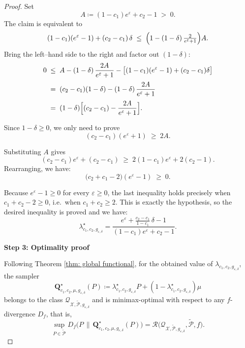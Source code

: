 \documentclass[accepted]{article}
\theoremstyle{plain} %
\theoremstyle{definition}
\theoremstyle{remark}
\newcommand{\eps}{\varepsilon}
\newcommand{\bQ}{\mathbf{Q}}
\begin{document}
\begin{proof}
Set
\[
A \coloneqq (1 - c_1)e^\varepsilon + c_2 - 1 \;>\; 0.
\]
The claim is equivalent to
\[
(1 - c_1)(e^\varepsilon - 1) + (c_2 - c_1)\,\delta
\;\le\;
\Bigl(1 - (1-\delta)\,\tfrac{2}{e^\varepsilon + 1}\Bigr)A .
\] 
Bring the left–hand side to the right and factor out $(1-\delta)$:  
\begin{align*}
0
&\;\le\;
A - (1-\delta)\,\frac{2A}{e^\varepsilon + 1}
      -\bigl[(1 - c_1)(e^\varepsilon - 1) + (c_2 - c_1)\delta\bigr]\\[2pt]
&\;=\;
(c_2 - c_1)(1-\delta) - (1-\delta)\,\frac{2A}{e^\varepsilon + 1}\\[2pt]
&\;=\;
(1-\delta)\Bigl[(c_2 - c_1) - \frac{2A}{e^\varepsilon + 1}\Bigr].
\end{align*}

Since $1-\delta \ge 0$, we only need to prove  
\[
(c_2 - c_1)(e^\varepsilon + 1) \;\ge\; 2A .
\]

Substituting $A$ gives
\[
(c_2 - c_1)e^\varepsilon + (c_2 - c_1)
\;\ge\;
2(1 - c_1)e^\varepsilon + 2(c_2 - 1).
\]
Rearranging, we have:
\[
\bigl(c_2 + c_1 - 2\bigr)(e^\varepsilon - 1)\;\ge\;0.
\]

Because $e^\varepsilon - 1 \ge 0$ for every $\varepsilon \ge 0$,
the last inequality holds precisely when $c_1 + c_2 - 2 \ge 0$,
i.e.\ when $c_1 + c_2 \ge 2$.  This is exactly the hypothesis,
so the desired inequality is proved and we have:
\[\lambda^\star_{c_1,c_2,g_{\varepsilon,\delta}} = \frac{e^{\varepsilon} + \frac{c_2 - c_1}{1 - c_1} \, \delta - 1}{(1 - c_1) e^{\varepsilon} + c_2 - 1}.\]

\textbf{Step 3: Optimality proof}

Following Theorem \ref{thm: global functional}, for the obtained value of $\lambda_{c_1,c_2,g_{\eps,\delta}}$, 
the sampler \begin{equation*}
    \bQ^\star_{c_1,c_2,\mu,g_{\varepsilon,\delta}}(P) \coloneqq \lambda^\star_{c_1,c_2,g_{\varepsilon,\delta}} P + (1 - \lambda^\star_{c_1,c_2,g_{\varepsilon,\delta}})\mu
\end{equation*}
belongs to the class $\mathcal{Q}_{\mathcal{X}, \tilde{\mathcal{P}}, g_{\varepsilon,\delta}}$ and is minimax-optimal with respect to any $f$-divergence $D_f$, that is,
\begin{equation*}
    \sup_{P \in \tilde{\mathcal{P}}} D_f\big(P \, \| \, \bQ^\star_{c_1,c_2,\mu,g_{\varepsilon,\delta}}(P)\big)
    = \mathcal{R}\big(\mathcal{Q}_{\mathcal{X}, \tilde{\mathcal{P}}, g_{\varepsilon,\delta}}, \tilde{\mathcal{P}}, f\big).
\end{equation*}
\end{proof}
\end{document}
